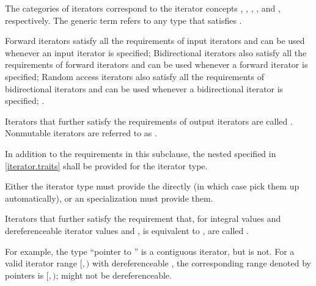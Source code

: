 {\color{addclr}
\pnum
The  categories of iterators correspond to the iterator concepts
,
,
,
, and
, respectively.
The generic term  refers to any type that satisfies 
 .
} %


\pnum
Forward iterators satisfy all the requirements of input
iterators and can be used whenever
an input iterator is specified;
Bidirectional iterators also satisfy all the requirements of
forward iterators and can be used whenever a forward iterator is specified;
Random access iterators also satisfy all the requirements of bidirectional
iterators and can be used whenever a bidirectional iterator is specified;
.

\pnum
Iterators that further satisfy the requirements of output iterators are
called . Nonmutable iterators are referred to
as .

\pnum
In addition to the requirements in this subclause,
the nested  specified in \ref{iterator.traits}
shall be provided for the iterator type.
\begin{note} Either the iterator type must provide the  directly
(in which case  pick them up automatically), or
an  specialization must provide them. \end{note}

{\color{oldclr}
\pnum
Iterators that further satisfy the requirement that,
for integral values  and
dereferenceable iterator values  and ,
 is equivalent to ,
are called .
\begin{note}
For example, the type ``pointer to '' is a contiguous iterator,
but  is not.
For a valid iterator range $[$$, $$)$ with dereferenceable ,
the corresponding range denoted by pointers is
$[$$, $$)$;
 might not be dereferenceable.
\end{note}
} %


